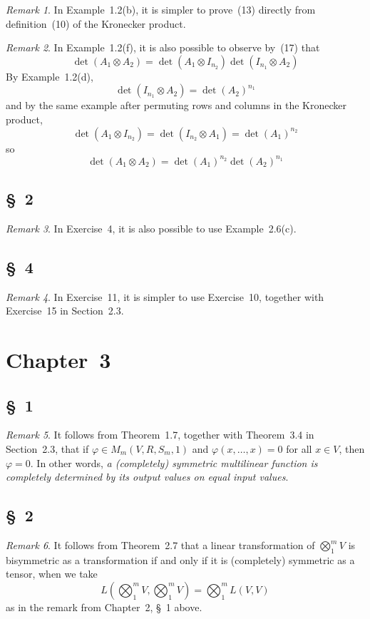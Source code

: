 \documentclass[letterpaper,12pt]{article}
\newcommand{\tprod}{\otimes}
\newcommand{\bigtprod}{\bigotimes}
\newcommand{\medtprod}{{\textstyle\bigtprod}}
\theoremstyle{definition}
\theoremstyle{remark}
\newtheorem*{rmk}{Remark}
\begin{document}
\begin{rmk}
In Example~1.2(b), it is simpler to prove~(13) directly from definition~(10) of the Kronecker product.
\end{rmk}

\begin{rmk}
In Example~1.2(f), it is also possible to observe by~(17) that
\[\det(A_1\tprod A_2)=\det(A_1\tprod I_{n_2})\det(I_{n_1}\tprod A_2)\]
By Example~1.2(d),
\[\det(I_{n_1}\tprod A_2)=\det(A_2)^{n_1}\]
and by the same example after permuting rows and columns in the Kronecker product,
\[\det(A_1\tprod I_{n_2})=\det(I_{n_2}\tprod A_1)=\det(A_1)^{n_2}\]
so
\[\det(A_1\tprod A_2)=\det(A_1)^{n_2}\det(A_2)^{n_1}\]
\end{rmk}

\subsection*{\S~2}
\begin{rmk}
In Exercise~4, it is also possible to use Example~2.6(c).
\end{rmk}

\subsection*{\S~4}
\begin{rmk}
In Exercise~11, it is simpler to use Exercise~10, together with Exercise~15 in Section~2.3.
\end{rmk}

\newpage
\section*{Chapter~3}
\subsection*{\S~1}
\begin{rmk}
It follows from Theorem~1.7, together with Theorem~3.4 in Section~2.3, that if \(\varphi\in M_m(V,R,S_m,1)\) and \(\varphi(x,\ldots,x)=0\) for all \(x\in V\), then \(\varphi=0\). In other words, \emph{a (completely) symmetric multilinear function is completely determined by its output values on equal input values}.
\end{rmk}

\subsection*{\S~2}
\begin{rmk}
It follows from Theorem~2.7 that a linear transformation of \(\medtprod_1^m V\) is bisymmetric as a transformation if and only if it is (completely) symmetric as a tensor, when we take
\[L(\medtprod_1^m V,\medtprod_1^m V)=\medtprod_1^m L(V,V)\]
as in the remark from Chapter~2, \S~1 above.
\end{rmk}
\end{document}
